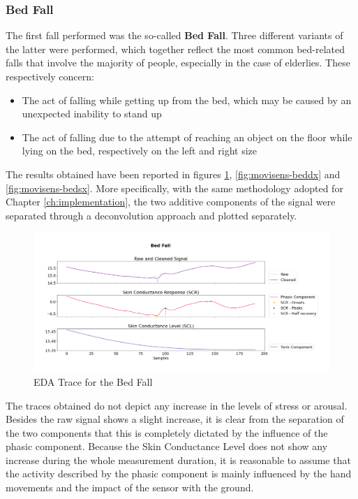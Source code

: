 \subsubsection{Bed Fall}\label{subsubsec:bed-fall}

The first fall performed was the so-called \textbf{Bed Fall}. Three different variants of the latter were performed, which together reflect the most common bed-related falls that involve the majority of people, especially in the case of elderlies. These respectively concern: 

\begin{itemize}
    \item The act of falling while getting up from the bed, which may be caused by an unexpected inability to stand up 
    \item The act of falling due to the attempt of reaching an object on the floor while lying on the bed, respectively on the left and right size
\end{itemize}

The results obtained have been reported in figures \ref{fig:movisens-bed}, \ref{fig:movisens-beddx} and \ref{fig:movisens-bedsx}. More specifically, with the same methodology adopted for Chapter \ref{ch:implementation}, the two additive components of the signal were separated through a deconvolution approach and plotted separately.

\begin{figure}[h!]
    \centering
    \includegraphics[width=\textwidth]{./images/movisens/Bed.png}
    \caption{EDA Trace for the Bed Fall}
    \label{fig:movisens-bed}
\end{figure}

The traces obtained do not depict any increase in the levels of stress or arousal. Besides the raw signal shows a slight increase, it is clear from the separation of the two components that this is completely dictated by the influence of the phasic component. Because the Skin Conductance Level does not show any increase during the whole measurement duration, it is reasonable to assume that the activity described by the phasic component is mainly influenced by the hand movements and the impact of the sensor with the ground.

